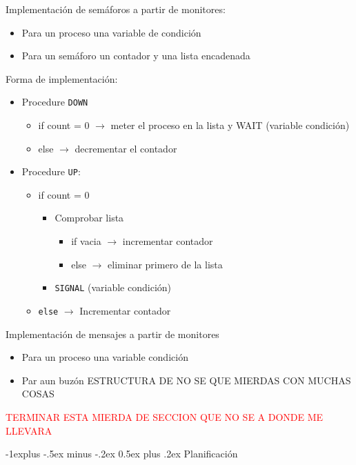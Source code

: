 \documentclass[10pt,portrait, twocolumn]{article}
\makeatletter
\renewcommand{\subsection}{\@startsection{subsection}{2}{0mm}%
                                {-1explus -.5ex minus -.2ex}%
                                {0.5ex plus .2ex}%
                                {\normalfont\normalsize\bfseries}}
\makeatother
\begin{document}
Implementación de semáforos a partir de monitores:
	
	\begin{itemize}
	\item Para un proceso una variable de condición
	\item Para un semáforo un contador y una lista encadenada
	\end{itemize}

Forma de implementación:

	\begin{itemize}
	\item Procedure \texttt{DOWN}
	
		\begin{itemize}
		\item if count = 0 $\rightarrow$ meter el proceso en la lista y WAIT (variable condición)
		\item else $\rightarrow$ decrementar el contador
		\end{itemize}
	\item Procedure \texttt{UP}:
		\begin{itemize}
		\item if count = 0
			\begin{itemize}
			\item Comprobar lista
			\begin{itemize}
			\item if vacia $\rightarrow$ incrementar contador
			\item else $\rightarrow$ eliminar primero de la lista
			\end{itemize}
			\item \texttt{SIGNAL} (variable condición)
			\end{itemize}
		\item \texttt{else} $\rightarrow$ Incrementar contador
		\end{itemize}
	\end{itemize}
	
Implementación de mensajes a partir de monitores

	\begin{itemize}
	\item Para un proceso una variable condición 
	\item Par aun buzón ESTRUCTURA DE NO SE QUE MIERDAS CON MUCHAS COSAS
	\end{itemize}
	
\textcolor{red}{TERMINAR ESTA MIERDA DE SECCION QUE NO SE A DONDE ME LLEVARA}

\subsection{Planificación}
\end{document}
